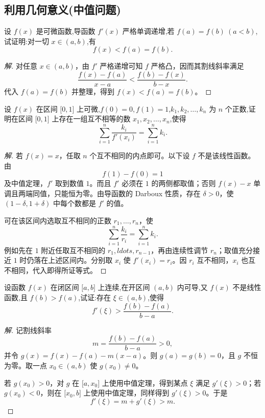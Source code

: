 \documentclass[../../数学分析培优讲义(答案版).tex]{subfiles}
\begin{document}
\subsection{利用几何意义(中值问题)}

\begin{example}
设 $f(x)$ 是可微函数,导函数 $f'(x)$ 严格单调递增,若 $f(a)=f(b)\ (a<b)$,试证明:对一切 $x\in(a,b)$,有
\[
    f(x)<f(a)=f(b).
\]
\end{example}

\begin{proof}[解]
对任意 $x\in(a,b)$，由 $f'$ 严格递增可知 $f$ 严格凸，因而其割线斜率满足
\[
    \dfrac{f(x)-f(a)}{x-a}
    <\dfrac{f(b)-f(x)}{b-x}.
\]
代入 $f(a)=f(b)$ 并整理，得到 $f(x)<f(a)=f(b)$。
\end{proof}

\begin{example}
设 $f(x)$ 在区间 $\lbrack 0,1\rbrack$ 上可微,$f(0)=0,f(1)=1$,$k_1,k_2,\ldots,k_n$ 为 $n$ 个正数,证明在区间 $\lbrack 0,1\rbrack$ 上存在一组互不相等的数 $x_1,x_2,\ldots,x_n$,使得
\[
    \sum\limits_{i=1}^n\dfrac{k_i}{f'(x_i)}
    =\sum\limits_{i=1}^n k_i.
\]
\end{example}

\begin{proof}[解]
若 $f(x)=x$，任取 $n$ 个互不相同的内点即可。以下设 $f$ 不是该线性函数。由
\[
    f(1)-f(0)=1
\]
及中值定理，$f'$ 取到数值 $1$。而且 $f'$ 必须在 $1$ 的两侧都取值；否则 $f(x)-x$ 单调且两端同值，只能恒为零。由导函数的 Darboux 性质，存在 $\delta>0$，使 $(1-\delta,1+\delta)$ 中每个数都是 $f'$ 的值。

可在该区间内选取互不相同的正数 $r_1,\ldots,r_n$，使
\[
    \sum\limits_{i=1}^{n}\dfrac{k_i}{r_i}
    =\sum\limits_{i=1}^{n}k_i.
\]
例如先在 $1$ 附近任取互不相同的 $r_1,ldots,r_{n-1}$，再由连续性调节 $r_n$；取值充分接近 $1$ 时仍落在上述区间内。分别取 $x_i$ 使 $f'(x_i)=r_i$。因 $r_i$ 互不相同，$x_i$ 也互不相同，代入即得所证等式。
\end{proof}

\begin{example}
设函数 $f(x)$ 在闭区间 $\lbrack a,b\rbrack$ 上连续,在开区间 $(a,b)$ 内可导,又 $f(x)$ 不是线性函数,且 $f(b)>f(a)$,试证:存在 $\xi\in(a,b)$,使得
\[
    f'(\xi)>\dfrac{f(b)-f(a)}{b-a}.
\]
\end{example}

\begin{proof}[解]
记割线斜率
\[
    m=\dfrac{f(b)-f(a)}{b-a}>0,
\]
并令 $g(x)=f(x)-f(a)-m(x-a)$。则 $g(a)=g(b)=0$，且 $g$ 不恒为零。取一点 $x_0\in(a,b)$ 使 $g(x_0)\neq0$。

若 $g(x_0)>0$，对 $g$ 在 $\lbrack a,x_0\rbrack$ 上使用中值定理，得到某点 $\xi$ 满足 $g'(\xi)>0$；若 $g(x_0)<0$，则在 $\lbrack x_0,b\rbrack$ 上使用中值定理，同样得到 $g'(\xi)>0$。于是
\[
    f'(\xi)=m+g'(\xi)>m.
\]
\end{proof}
\end{document}
